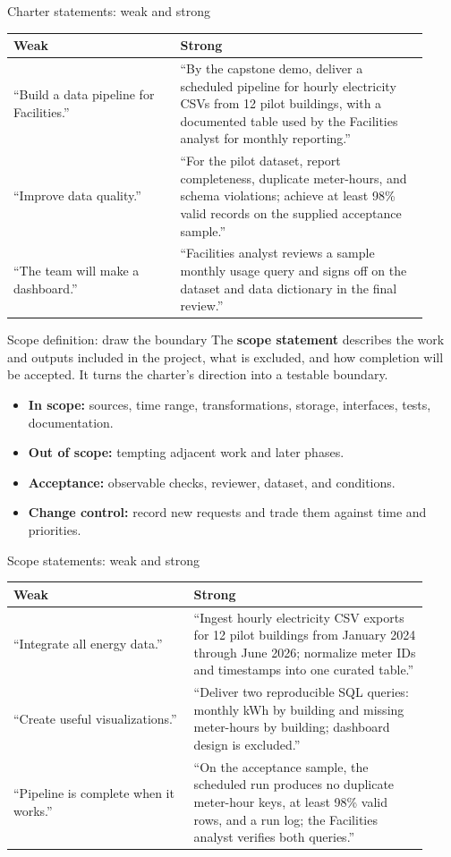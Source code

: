 \documentclass[aspectratio=43,12pt]{beamer}
\begin{document}
\begin{frame}{Charter statements: weak and strong}
\footnotesize
\begin{tabular}{p{0.375\linewidth}p{0.55\linewidth}}
\textbf{Weak} & \textbf{Strong}\\\hline
``Build a data pipeline for Facilities.'' & ``By the capstone demo, deliver a scheduled pipeline for hourly electricity CSVs from 12 pilot buildings, with a documented table used by the Facilities analyst for monthly reporting.''\\[0.7em]
``Improve data quality.'' & ``For the pilot dataset, report completeness, duplicate meter-hours, and schema violations; achieve at least 98\% valid records on the supplied acceptance sample.''\\[0.7em]
``The team will make a dashboard.'' & ``Facilities analyst reviews a sample monthly usage query and signs off on the dataset and data dictionary in the final review.''
\end{tabular}
\end{frame}

\begin{frame}{Scope definition: draw the boundary}
The \textbf{scope statement} describes the work and outputs included in the project, what is excluded, and how completion will be accepted. It turns the charter's direction into a testable boundary.
\vspace{0.7em}
\begin{itemize}
\item \textbf{In scope:} sources, time range, transformations, storage, interfaces, tests, documentation.
\item \textbf{Out of scope:} tempting adjacent work and later phases.
\item \textbf{Acceptance:} observable checks, reviewer, dataset, and conditions.
\item \textbf{Change control:} record new requests and trade them against time and priorities.
\end{itemize}
\end{frame}

\begin{frame}{Scope statements: weak and strong}
\footnotesize
\begin{tabular}{p{0.4\linewidth}p{0.525\linewidth}}
\textbf{Weak} & \textbf{Strong}\\\hline
``Integrate all energy data.'' & ``Ingest hourly electricity CSV exports for 12 pilot buildings from January 2024 through June 2026; normalize meter IDs and timestamps into one curated table.''\\[0.7em]
``Create useful visualizations.'' & ``Deliver two reproducible SQL queries: monthly kWh by building and missing meter-hours by building; dashboard design is excluded.''\\[0.7em]
``Pipeline is complete when it works.'' & ``On the acceptance sample, the scheduled run produces no duplicate meter-hour keys, at least 98\% valid rows, and a run log; the Facilities analyst verifies both queries.''
\end{tabular}
\end{frame}
\end{document}
